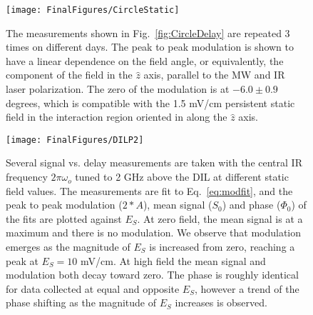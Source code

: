\documentclass[aps,pra,preprint,groupedaddress]{revtex4-1}
\begin{document}
\begin{figure}
	\texttt{[image: FinalFigures/CircleStatic]}
	\caption{The measurements shown in Fig.~\ref{fig:CircleDelay} are repeated 3 times on different days. The peak to peak modulation is shown to have a linear dependence on the field angle, or equivalently, the component of the field in the $\hat{z}$ axis, parallel to the MW and IR laser polarization. The zero of the modulation is at $-6.0 \pm 0.9$ degrees, which is compatible with the 1.5 mV/cm persistent static field in the interaction region oriented in along the $\hat{z}$ axis.}
	\label{fig:CircleStatic}
\end{figure}



\begin{figure}
	\texttt{[image: FinalFigures/DILP2]}
	\caption{Several signal vs. delay measurements are taken with the central IR frequency $2\pi\omega_o$ tuned to 2 GHz above the DIL at different static field values. The measurements are fit to Eq.~\ref{eq:modfit}, and the peak to peak modulation ($2*A$), mean signal ($S_0$) and phase ($\Phi_0$) of the fits are plotted against $E_S$. At zero field, the mean signal is at a maximum and there is no modulation. We observe that modulation emerges as the magnitude of $E_S$ is increased from zero, reaching a peak at $E_S = 10$ mV/cm. At high field the mean signal and modulation both decay toward zero. The phase is roughly identical for data collected at equal and opposite $E_S$, however a trend of the phase shifting as the magnitude of $E_S$ increases is observed.}
	\label{fig:DILP2}
\end{figure}
\end{document}
